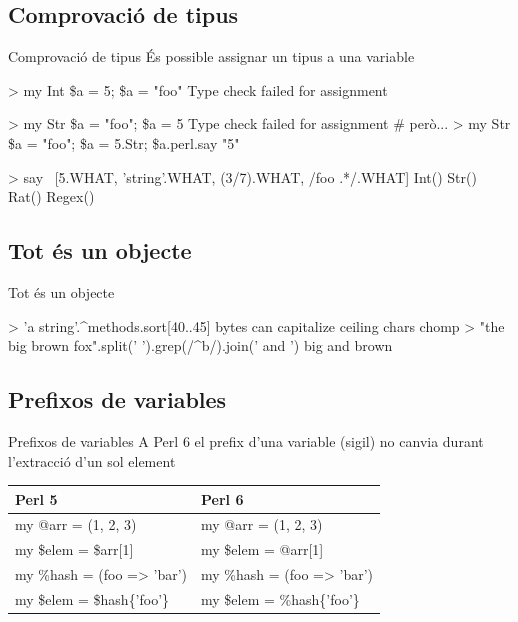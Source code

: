 \documentclass{beamer}
\begin{document}
			\subsection{Comprovació de tipus}
\begin{frame}[fragile]{Comprovació de tipus}
	És possible assignar un tipus a una variable

	\begin{semiverbatim}
\alert{> my Int \$a = 5; \$a = "foo"}
Type check failed for assignment
	\end{semiverbatim}

	\begin{semiverbatim}
\alert{> my Str \$a = "foo"; \$a = 5}
Type check failed for assignment
# però...
\alert{> my Str \$a = "foo"; \$a = 5.Str; \$a.perl.say}
"5"
	\end{semiverbatim}
	\begin{semiverbatim}
\alert{> say ~[5.WHAT, 'string'.WHAT, (3/7).WHAT, /foo .*/.WHAT]}
Int() Str() Rat() Regex()
	\end{semiverbatim}
\end{frame}

			\subsection{Tot és un objecte}

\begin{frame}[fragile]{Tot és un objecte}
	\begin{semiverbatim}
\alert{> 'a string'.\^\relax{}methods.sort[40..45]}
bytes can capitalize ceiling chars chomp
\alert{> "the big brown fox".split(' ').grep(/\^\relax{}b/).join(' and ')}
big and brown
	\end{semiverbatim}
\end{frame}
			\subsection{Prefixos de variables}
\begin{frame}{Prefixos de variables}
		A Perl 6 el prefix d'una variable (sigil) no canvia durant l'extracció d'un sol element
	\vskip15pt
	\begin{tabular}{l|l}
	Perl 5 & Perl 6 \\
	\hline
	\hline
	my @arr = (1, 2, 3) & my @arr = (1, 2, 3) \\
	my \$elem = \alert{\$arr}[1] & my \$elem = \alert{@arr}[1] \\
	\hline
	my \%hash = (foo => 'bar') & my \%hash = (foo => 'bar') \\
	my \$elem = \alert{\$hash}\{'foo'\} & my \$elem = \alert{\%hash}\{'foo'\} \\
	\end{tabular}
\end{frame}
\end{document}
